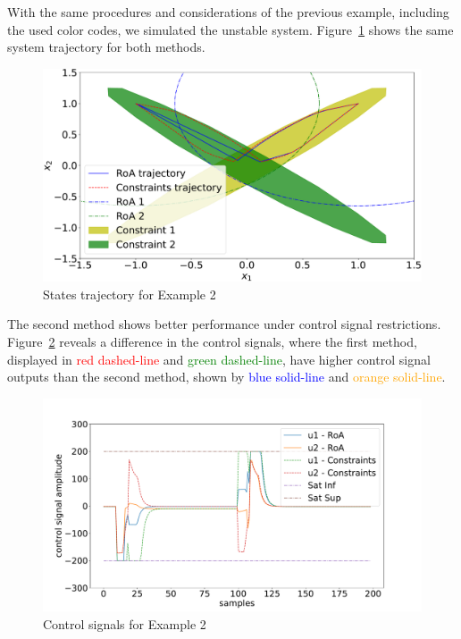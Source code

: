 With the same procedures and considerations of the previous example, including
the used color codes, we simulated the unstable system.
Figure~\ref{fig:unstable-states} shows the same system trajectory for both
methods.

\begin{figure}[ht!]
  \centering
  \captionsetup{justification=centering}
  \includegraphics[width=\linewidth]{imgs/unstable_states}
  \caption{States trajectory for Example 2}%
  \label{fig:unstable-states}
\end{figure}

The second method shows better performance under control signal restrictions.
Figure~\ref{fig:unstable-control-signals} reveals a difference in the control
signals, where the first method, displayed in \textcolor{red}{red dashed-line}
and \textcolor{green}{green dashed-line}, have higher control signal outputs
than the second method, shown by \textcolor{blue}{blue solid-line} and
\textcolor{orange}{orange solid-line}.

\begin{figure}[ht!]
  \centering
  \captionsetup{justification=centering}
  \includegraphics[width=\linewidth]{imgs/unstable_control_signal}
  \caption{Control signals for Example 2}%
  \label{fig:unstable-control-signals}
\end{figure}

